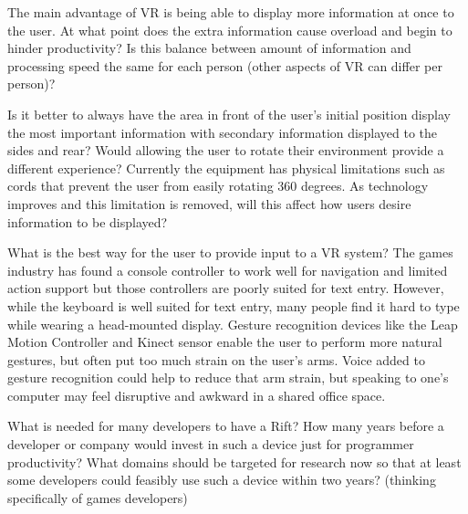 \documentclass{acm_proc_article-sp}
\begin{document}
The main advantage of VR is being able to display more information at once to the user.  At what point does the extra information cause overload and begin to hinder productivity?  Is this balance between amount of information and processing speed the same for each person (other aspects of VR can differ per person)?

Is it better to always have the area in front of the user's initial position display the most important information with secondary information displayed to the sides and rear? Would allowing the user to rotate their environment provide a different experience?
Currently the equipment has physical limitations such as cords that prevent the user from easily rotating 360 degrees. As technology improves and this limitation is removed, will this affect how users desire information to be displayed?



What is the best way for the user to provide input to a VR system? The games industry has found a console controller to work well for navigation and limited action support but those controllers are poorly suited for text entry. However, while the keyboard is well suited for text entry, many people find it hard to type while wearing a head-mounted display. Gesture recognition devices like the Leap Motion Controller and Kinect sensor enable the user to perform more natural gestures, but often put too much strain on the user's arms. Voice added to gesture recognition could help to reduce that arm strain, but speaking to one's computer may feel disruptive and awkward in a shared office space.

What is needed for many developers to have a Rift? How many years before a developer or company would invest in such a device just for programmer productivity? What domains should be targeted for research now so that at least some developers could feasibly use such a device within two years? (thinking specifically of games developers)
\end{document}
